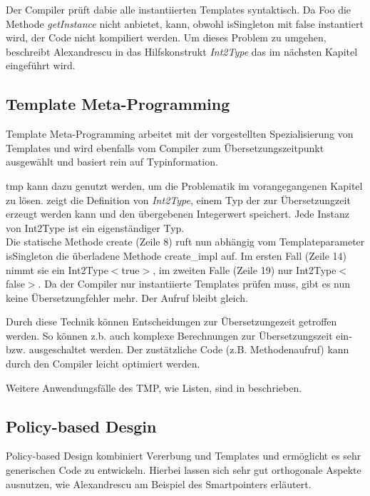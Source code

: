 

 Der Compiler prüft dabie alle instantiierten Templates syntaktisch. Da Foo die Methode \emph{getInstance} nicht anbietet, kann, obwohl isSingleton mit false instantiert wird, der Code nicht kompiliert werden. Um dieses Problem zu umgehen, beschreibt Alexandrescu in \cite{Alexandrescu2001Modern} das Hilfskonstrukt \emph{Int2Type} das im nächsten Kapitel eingeführt wird.

\subsection{Template Meta-Programming}
Template Meta-Programming arbeitet mit der vorgestellten Spezialisierung von Templates und wird ebenfalls vom Compiler zum Übersetzungszeitpunkt ausgewählt und basiert rein auf Typinformation.

\ac{tmp} kann dazu genutzt werden, um die Problematik im vorangegangenen Kapitel zu lösen.  zeigt die Definition von \emph{Int2Type}, einem Typ der zur Übersetzungzeit erzeugt werden kann und den übergebenen Integerwert speichert. Jede Instanz von Int2Type ist ein eigenständiger Typ.\\
Die statische Methode create (Zeile 8) ruft nun abhängig vom Templateparameter isSingleton die überladene Methode create\_impl auf. Im ersten Fall (Zeile 14) nimmt sie ein Int2Type$<$true$>$, im zweiten Falle (Zeile 19) nur Int2Type$<$false$>$. Da der Compiler nur instantiierte Templates prüfen muss, gibt es nun keine Übersetzungfehler mehr. Der Aufruf bleibt gleich.



Durch diese Technik können Entscheidungen zur Übersetzungezeit getroffen werden. So können z.b. auch komplexe Berechnungen zur Übersetzungszeit ein- bzw. ausgeschaltet werden. Der zustätzliche Code (z.B. Methodenaufruf) kann durch den Compiler leicht optimiert werden.

Weitere Anwendungsfälle des \ac{TMP}, wie Listen, sind in  \cite{Alexandrescu2001Modern} beschrieben.

\subsection{Policy-based Desgin}
Policy-based Design kombiniert Vererbung und Templates und ermöglicht es sehr generischen Code zu entwickeln. Hierbei lassen sich sehr gut orthogonale Aspekte ausnutzen, wie Alexandrescu am Beispiel des Smartpointers erläutert.

